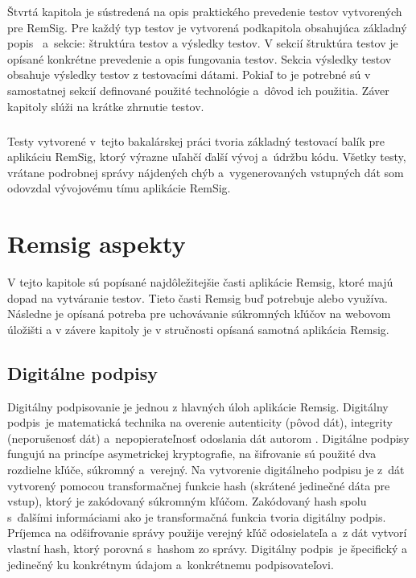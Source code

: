 \documentclass[
  digital, %
  table,   %
oneside,
  nolof,     %
  nolot,     %
]{fithesis3}
\begin{document}
Štvrtá kapitola je sústredená na opis praktického prevedenie testov vytvorených pre RemSig. Pre každý typ testov je vytvorená podkapitola obsahujúca základný popis~ a~sekcie: štruktúra testov a výsledky testov. V sekcií štruktúra testov je opísané konkrétne prevedenie a opis fungovania testov. Sekcia výsledky testov obsahuje výsledky testov z testovacími dátami. Pokiaľ to je potrebné sú v samostatnej sekcií definované použité technológie a~dôvod ich použitia. Záver kapitoly slúži na krátke zhrnutie testov.\paragraph{}
Testy vytvorené v~tejto bakalárskej práci tvoria základný testovací balík pre aplikáciu RemSig, ktorý výrazne uľahčí ďalší vývoj a~údržbu kódu. Všetky testy, vrátane podrobnej správy nájdených chýb a~vygenerovaných vstupných dát som odovzdal vývojovému tímu aplikácie RemSig.
\chapter{Remsig aspekty}
V tejto kapitole sú popísané najdôležitejšie časti aplikácie Remsig, ktoré majú dopad na vytváranie testov. Tieto časti Remsig buď potrebuje alebo využíva. Následne je opísaná potreba pre uchovávanie súkromných kľúčov na webovom úložišti a v závere kapitoly je v stručnosti opísaná samotná aplikácia Remsig.
\section{Digitálne podpisy}
Digitálny podpisovanie je jednou z hlavných úloh aplikácie Remsig. Digitálny podpis~je matematická technika na overenie autenticity (pôvod dát), integrity (neporušenosť dát) a~nepopierateľnosť odoslania dát autorom \cite{digitalSignature}.  Digitálne podpisy fungujú na princípe asymetrickej kryptografie, na šifrovanie sú použité dva rozdielne kľúče, súkromný a~verejný. Na vytvorenie digitálneho podpisu je z~dát vytvorený pomocou transformačnej funkcie  hash (skrátené jedinečné dáta pre vstup), ktorý je zakódovaný súkromným kľúčom. Zakódovaný hash spolu s~ďalšími informáciami ako je transformačná funkcia tvoria digitálny podpis. Príjemca na odšifrovanie správy použije verejný kľúč odosielateľa a~z dát vytvorí vlastní hash, ktorý porovná s~hashom zo správy. Digitálny podpis~je špecifický a jedinečný ku konkrétnym údajom a~konkrétnemu podpisovateľovi.
\end{document}
